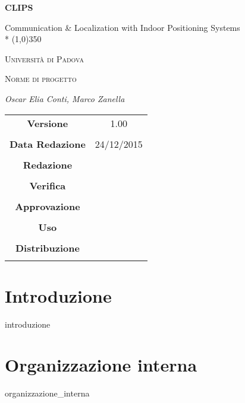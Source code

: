 \documentclass[a4paper,twoside,12pt]{article}
\author{Oscar Elia Conti, Marco Zanella}
\date{24/12/2015}
\begin{document}
\begin{titlepage}
	\centering
	{\huge\bfseries CLIPS\par}
	Communication \& Localization with Indoor Positioning Systems \\*
	\line(1,0){350} \\
	{\scshape\LARGE Università di Padova \par}
	\vspace{1cm}
	{\scshape\Large Norme di progetto\par}
	\vspace{1.5cm}
	
	\vspace{2cm}
	{\Large\itshape Oscar Elia Conti, Marco Zanella\par}
	
	\vfill \vfill
	\begin{tabular}{c|c}
	{\hfill \textbf{Versione}} & 1.00\\ \\
	{\hfill\textbf{Data Redazione}} & 24/12/2015  \\ \\
	{\hfill\textbf{Redazione}} &  \\ \\
	{\hfill\textbf{Verifica}} &  \\ \\
	{\hfill\textbf{Approvazione}} &  \\ \\
	{\hfill\textbf{Uso}} & \\ \\
	{\hfill\textbf{Distribuzione}} & \\ \\
	\end{tabular}
\end{titlepage}
	
	\newpage

	\tableofcontents

	\newpage
	
	\newpage
	\section{Introduzione}
		{introduzione}


	\newpage
	\section{Organizzazione interna}
		{organizzazione_interna}
	
\end{document}
